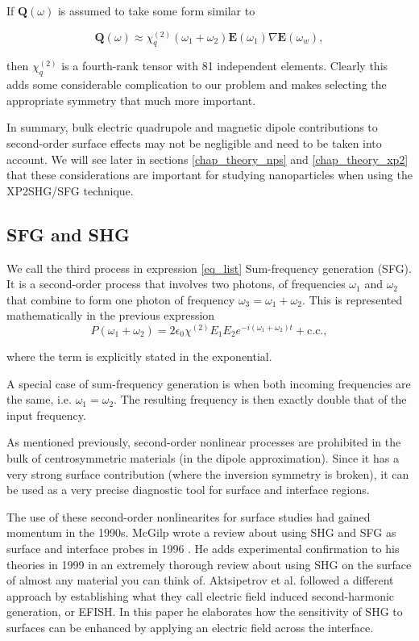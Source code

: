 If $\mathbf{Q}(\omega)$ is assumed to take some form similar to

\begin{equation}
\mathbf{Q}(\omega) \approx \chi^{(2)}_{q}(\omega_{1} + \omega_{2})\mathbf{E}(\omega_{1})\nabla\mathbf{E}(\omega_{w}),
\end{equation}

then $\chi^{(2)}_{q}$ is a fourth-rank tensor with 81 independent elements. Clearly this adds some considerable complication to our problem and makes selecting the appropriate symmetry that much more important.

In summary, bulk electric quadrupole and magnetic dipole contributions to second-order surface effects may not be negligible and need to be taken into account. We will see later in sections \ref{chap_theory_nps} and \ref{chap_theory_xp2} that these considerations are important for studying nanoparticles when using the XP2SHG/SFG technique.

\subsection{SFG and SHG}\label{chap_theory_sum}
We call the third process in expression \eqref{eq_list} Sum-frequency generation (SFG). It is a second-order process that involves two photons, of frequencies $\omega_{1}$ and $\omega_{2}$ that combine to form one photon of frequency $\omega_{3} = \omega_{1} + \omega_{2}$. This is represented mathematically in the previous expression
\begin{equation}
P(\omega_{1}+\omega_{2}) = 2\epsilon_{0}\chi^{(2)}E_{1}E_{2}e^{-i(\omega_{1}+\omega_{2})t} + \text{c.c.},
\end{equation}

where the term is explicitly stated in the exponential. 

A special case of sum-frequency generation is when both incoming frequencies are the same, i.e. $\omega_{1} = \omega_{2}$. The resulting frequency is then exactly double that of the input frequency. 

As mentioned previously, second-order nonlinear processes are prohibited in the bulk of centrosymmetric materials (in the dipole approximation). Since it has a very strong surface contribution (where the inversion symmetry is broken), it can be used as a very precise diagnostic tool for surface and interface regions.

The use of these second-order nonlinearites for surface studies had gained momentum in the 1990s. McGilp wrote a review about using SHG and SFG as surface and interface probes in 1996 \cite{mcgilp1996review}. He adds experimental confirmation to his theories in 1999 \cite{mcgilp1999second} in an extremely thorough review about using SHG on the surface of almost any material you can think of. Aktsipetrov et al. \cite{aktsipetrov1997dc} followed a different approach by establishing what they call electric field induced second-harmonic generation, or EFISH. In this paper he elaborates how the sensitivity of SHG to surfaces can be enhanced by applying an electric field across the interface.

